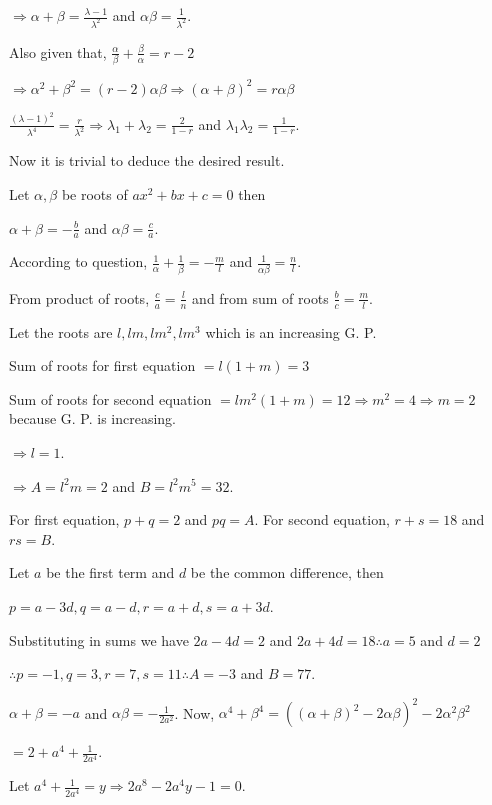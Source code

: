   $\Rightarrow \alpha + \beta = \frac{\lambda - 1}{\lambda^2}$ and $\alpha\beta = \frac{1}{\lambda^2}$.

  Also given that, $\frac{\alpha}{\beta} + \frac{\beta}{\alpha} = r - 2$

  $\Rightarrow \alpha^2 + \beta^2 = (r - 2)\alpha\beta\Rightarrow (\alpha + \beta)^2 = r\alpha\beta$

  $\frac{(\lambda - 1)^2}{\lambda^4} = \frac{r}{\lambda^2}\Rightarrow \lambda_1 + \lambda_2 = \frac{2}{1 -
    r}$ and $\lambda_1\lambda_2 = \frac{1}{1 - r}$.

  Now it is trivial to deduce the desired result.
\item Let $\alpha, \beta$ be roots of $ax^2 + bx + c = 0$ then

  $\alpha + \beta = -\frac{b}{a}$ and $\alpha\beta = \frac{c}{a}$.

  According to question, $\frac{1}{\alpha} + \frac{1}{\beta} = -\frac{m}{l}$ and $\frac{1}{\alpha\beta} =
  \frac{n}{l}$.

  From product of roots, $\frac{c}{a} = \frac{l}{n}$ and from sum of roots $\frac{b}{c} = \frac{m}{l}$.
\item Let the roots are $l, lm, lm^2, lm^3$ which is an increasing G. P.

  Sum of roots for first equation $= l(1 + m) = 3$

  Sum of roots for second equation $= lm^2(1 + m) = 12 \Rightarrow m^2 = 4 \Rightarrow m = 2$ because
  G. P. is increasing.

  $\Rightarrow l = 1$.

  $\Rightarrow A = l^2m = 2$ and $B = l^2m^5 = 32$.
\item For first equation, $p + q = 2$ and $pq = A.$ For second equation, $r + s = 18$ and $rs = B$.

  Let $a$ be the first term and $d$ be the common difference, then

  $p = a - 3d, q = a - d, r = a + d, s = a + 3d$.

  Substituting in sums we have $2a - 4d = 2$ and $2a + 4d = 18\therefore a = 5$ and $d = 2$

  $\therefore p = -1, q = 3, r = 7, s = 11\therefore A = -3$ and $B = 77$.
\item $\alpha + \beta = -a$ and $\alpha\beta = -\frac{1}{2a^2}$. Now, $\alpha^4 + \beta^4 = ((\alpha +
  \beta)^2 - 2\alpha\beta)^2 - 2\alpha^2\beta^2$

  $= 2 + a^4 + \frac{1}{2a^4}$.

  Let $a^4 + \frac{1}{2a^4} = y\Rightarrow 2a^8 - 2a^4y - 1 = 0$.

